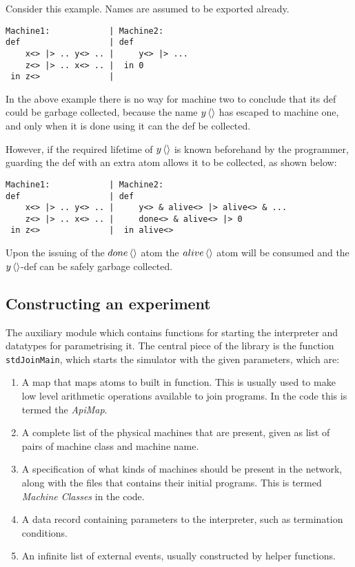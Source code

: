 Consider this example. Names are assumed to be exported already.
\begin{verbatim}
Machine1:            | Machine2:
def                  | def
    x<> |> .. y<> .. |     y<> |> ...
    z<> |> .. x<> .. |  in 0
 in z<>              |
\end{verbatim}

In the above example there is no way for machine two to conclude that its def
could be garbage collected, because the name $\atm y<>$ has escaped to machine
one, and only when it is done using it can the def be collected.

However, if the required lifetime of $\atm y<>$ is known beforehand by the
programmer, guarding the def with an extra atom allows it to be collected, as
shown below:
\begin{verbatim}
Machine1:            | Machine2:
def                  | def
    x<> |> .. y<> .. |     y<> & alive<> |> alive<> & ...
    z<> |> .. x<> .. |     done<> & alive<> |> 0
 in z<>              |  in alive<>
\end{verbatim}

Upon the issuing of the $\atm done<>$ atom the $\atm alive<>$ atom will be
consumed and the $\atm y<>$-def can be safely garbage collected.

\subsection{Constructing an experiment}
The auxiliary module which contains functions for
starting the interpreter and datatypes for parametrising it. The central piece
of the library is the function \texttt{stdJoinMain}, which starts the simulator
with the given parameters, which are:

\begin{enumerate}

\item A map that maps atoms to built in function. This is usually used to make
low level arithmetic operations available to join programs. In the code this is
termed the \emph{ApiMap}.

\item A complete list of the physical machines that are present, given as list
of pairs of machine class and machine name.

\item A specification of what kinds of machines should be present in the
network, along with the files that contains their initial programs. This is
termed \emph{Machine Classes} in the code.

\item A data record containing parameters to the interpreter, such as
termination conditions.

\item An infinite list of external events, usually constructed by helper
functions.

\end{enumerate}

